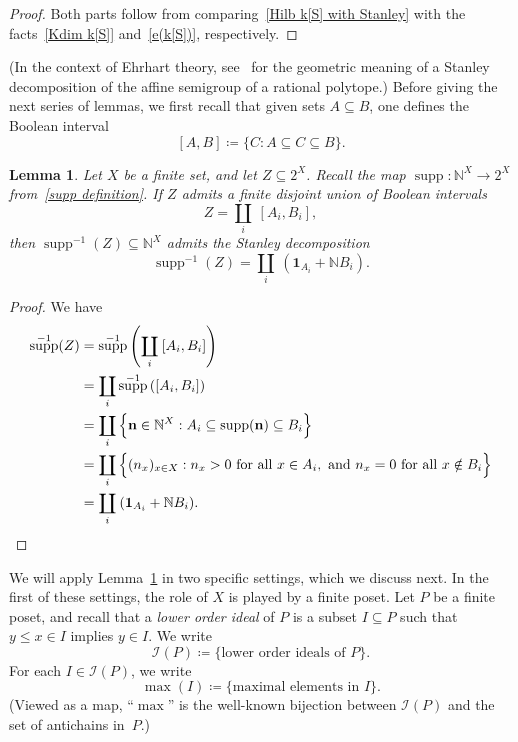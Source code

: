 \documentclass[noamsfonts,10pt]{amsart}
\newcommand{\N}{\mathbb{N}}
\newcommand{\I}{\mathcal{I}}
\DeclareMathOperator{\supp}{supp}
\newcommand{\1}{\mathbf{1}}
\theoremstyle{plain}
\newtheorem{lemma}[theorem]{Lemma}
\theoremstyle{definition}
\numberwithin{equation}{section}
\begin{document}
\begin{proof}
    Both parts follow from comparing~\eqref{Hilb k[S] with Stanley} with the facts~\eqref{Kdim k[S]} and~\eqref{e(k[S])}, respectively.
\end{proof}

(In the context of Ehrhart theory, see~\cites{BIS16,Stanley1980} for the geometric meaning of a Stanley decomposition of the affine semigroup of a rational polytope.)
Before giving the next series of lemmas, we first recall that given sets $A \subseteq B$, one defines the Boolean interval
    \begin{equation}
        \label{Boolean interval}
        [A,B] \coloneqq \{C : A \subseteq C \subseteq B \}.
    \end{equation}

\begin{lemma}
    \label{lemma:support}
    Let $X$ be a finite set, and let $Z \subseteq 2^X$.
    Recall the map $\supp : \N^X \longrightarrow 2^X$ from~\eqref{supp definition}.
    If $Z$ admits a finite disjoint union of Boolean intervals
    \[
        Z = \coprod_i \: [A_i, B_i],
    \]
    then $\supp^{-1}(Z) \subseteq \N^X$ admits the Stanley decomposition
    \[
        \supp^{-1}(Z) = \coprod_i \: ( \1_{A_i} + \N B_i ).
    \]
\end{lemma}

\begin{proof}
    We have
    \begin{align*}
        \supp^{-1}(Z) &= \supp^{-1} \left( \coprod_i \: [A_i, B_i] \right) \\
        &= \coprod_i \supp^{-1}\left( [A_i, B_i] \right) \\
        &= \coprod_i \Big\{ \mathbf{n} \in \N^X : A_i \subseteq \supp(\mathbf{n}) \subseteq B_i \Big\} \\
        &= \coprod_i \Big\{ (n_x)_{x \in X} : n_x > 0 \text{ for all } x \in A_i, \text{ and } n_x = 0 \text{ for all } x \notin B_i \Big\} \\
        &= \coprod_i \: (\1_{A_i} + \N B_i). \qedhere
    \end{align*}
\end{proof}

We will apply Lemma~\ref{lemma:support} in two specific settings, which we discuss next.
In the first of these settings, the role of $X$ is played by a finite poset.
Let $P$ be a finite poset, and recall that a \emph{lower order ideal} of $P$ is a subset $I \subseteq P$ such that $y \leq x \in I$ implies $y \in I$.
We write
    \begin{equation}
        \label{I(P)}
        \I(P) \coloneqq \{ \text{lower order ideals of $P$} \}.
    \end{equation}
For each $I \in \I(P)$, we write
    \begin{equation}
        \label{max(I)}
        \max(I) \coloneqq \{ \text{maximal elements in $I$} \}.
    \end{equation}
(Viewed as a map, ``$\max$'' is the well-known bijection between $\I(P)$ and the set of antichains in~$P$.)
\end{document}
